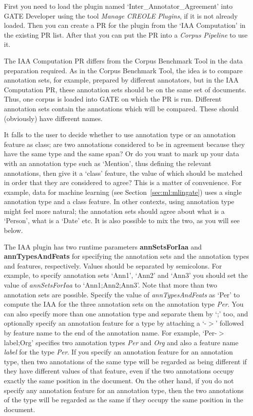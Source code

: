 First you need to load the plugin named `Inter\_Annotator\_Agreement' into
GATE Developer using the tool {\em Manage CREOLE Plugins}, if it is not
already loaded.  Then you can create a PR for the plugin from the
`IAA Computation' in the existing PR list. After that you can put
the PR into a {\em Corpus Pipeline} to use it.

The IAA Computation PR differs from the Corpus Benchmark Tool in the data
preparation required. As in the Corpus Benchmark Tool, the idea is to compare
annotation sets, for example, prepared by different annotators, but in the IAA
Computation PR, these annotation sets should be on the same set of documents.
Thus, one corpus is loaded into GATE on which the PR is run. Different annotation
sets contain the annotations which will be compared. These should (obviously)
have different names.

It falls to the user to decide whether to use annotation type or an annotation
feature as class; are two annotations considered to be in agreement because they
have the same type and the same span? Or do you want to mark up your data with
an annotation type such as `Mention', thus defining the relevant annotations,
then give it a `class' feature, the value of which should be matched in order
that they are considered to agree? This is a matter of convenience. For example,
data for machine learning (see Section~\ref {sec:ml:mlingate}) uses a single
annotation type and a class feature. In other contexts, using annotation type
might feel more natural; the annotation sets should agree about what is a
`Person', what is a `Date' etc. It is also possible to mix the two, as you will
see below.

The IAA plugin has two runtime parameters {\bf annSetsForIaa} and {\bf
annTypesAndFeats} for specifying the annotation sets and the annotation types and
features, respectively. Values should be separated by semicolons. For example, to
specify annotation sets `Ann1', `Ann2' and `Ann3' you should set the value of
{\em annSetsForIaa} to `Ann1;Ann2;Ann3'. Note that more than two annotation sets
are possible. Specify the value of {\em annTypesAndFeats} as `Per' to compute the
IAA for the three annotation sets on the annotation type {\em Per}. You can also
specify more than one annotation type and separate them by `;' too, and
optionally specify an annotation feature for a type by attaching a `-$>$'
followed by feature name to the end of the annotation name.  For example,
`Per-$>$label;Org' specifies two annotation types {\em Per} and {\em Org} and
also a feature name {\em label} for the type {\em Per}. If you specify an
annotation feature for an annotation type, then two annotations of the same type
will be regarded as being different if they have different values of that
feature, even if the two annotations occupy exactly the same position in the
document. On the other hand, if you do not specify any annotation feature for an
annotation type, then the two annotations of the type will be regarded as the
same if they occupy the same position in the document.


